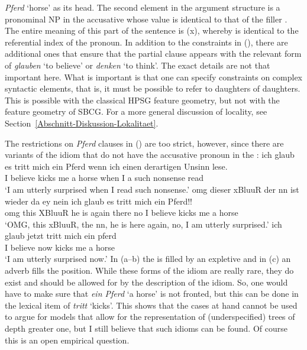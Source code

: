   \emph{Pferd} `horse' as its head. The second element in the argument structure is a pronominal NP in the accusative whose \local value
  is identical to that of the filler . The entire meaning of this part of the sentence is (x),
  whereby  is identical to the referential index of the pronoun.
 In addition to the constraints in (), there are additional ones that ensure that the partial clause appears with the relevant
 form of \emph{glauben} `to believe' or \emph{denken} `to think'. The exact details are not that important here. What is important is that one can specify constraints
 on complex syntactic elements, that is, it must be possible to refer to daughters of
 daughters. This is possible with the classical HPSG feature geometry, but not with the feature
 geometry of SBCG. For a more general discussion of locality, see
 Section~\ref{Abschnitt-Diskussion-Lokalitaet}. 

The restrictions on \emph{Pferd} clauses in () are too strict, however, since there are
variants of the idiom that do not have the accusative pronoun in the \vf:
\eal
\ex 
\gll ich glaub es tritt mich ein Pferd wenn ich einen derartigen Unsinn lese.\footnotemark\\
     I believe \expl{} kicks me a horse when I a such nonsense read\\
\glt `I am utterly surprised when I read such nonsense.'
\ex 
\gll omg dieser xBluuR der nn ist wieder da ey nein ich glaub es tritt mich ein Pferd!!\footnotemark\\
    omg this   XBluuR he  {} is  again there {} no I believe \expl{} kicks me a horse\\
\glt `OMG, this xBluuR, the nn, he is here again, no, I am utterly surprised.'
\ex 
\gll ich glaub jetzt tritt mich ein pferd\footnotemark\\
    I believe now   kicks me a horse\\
\glt `I am utterly surprised now.'
\zl
In (a--b) the \vf is filled by an expletive and in (c) an adverb fills the \vf position.
While these forms of the idiom are really rare, they do exist and should be allowed for by the
description of the idiom. So, one would have to make sure that \emph{ein Pferd} `a horse' is not
fronted, but this can be done in the lexical item of \emph{tritt} `kicks'. This shows that the cases
at hand cannot be used to argue for models that allow for the representation of (underspecified)
trees of depth greater one, but I still believe that such idioms can be found. Of course this is an
open empirical question. 

